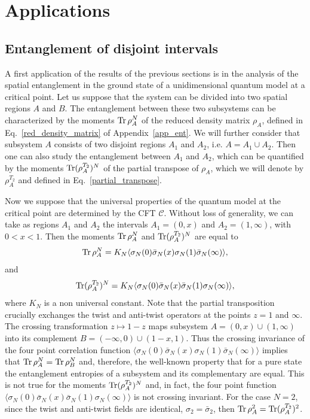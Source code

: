 \documentclass[a4paper,11pt]{article}
\def\Tr{\mathop{\mbox{\normalfont Tr}}\nolimits}
\begin{document}
\section{Applications}\label{sec:num_bootstrap}

\subsection{Entanglement of disjoint intervals}

A first application of the results of the previous sections is in 
the analysis of the spatial entanglement in the ground state of a 
unidimensional quantum model at a critical point. Let us suppose that 
the system can be divided into two spatial regions $A$ and $B$. The entanglement
between these two subsystems can be characterized by the moments $\Tr\rho_A^N$
of the reduced density matrix $\rho_A$, defined in Eq.~\eqref{red_density_matrix} 
of Appendix~\ref{app_ent}. We will further consider that subsystem $A$ consists 
of two disjoint regions $A_1$ and $A_2$, i.e. $A=A_1\cup A_2$. Then one can also 
study the entanglement between $A_1$ and $A_2$, which can be quantified by the moments 
$\Tr (\rho_A^{T_2})^N$ of the partial transpose of $\rho_A$, which we will denote by $\rho_A^{T_2}$
and defined in Eq.~\eqref{partial_transpose}.

Now we suppose that the universal properties of the quantum model at the critical 
point are determined by the CFT $\mathcal{C}$. Without loss of generality, we can 
take as regions $A_1$ and $A_2$ the intervals $A_1=(0, x)$ and $A_2=(1, \infty)$, 
with $0<x<1$. Then the moments $\Tr \rho_A^N $ and $\Tr (\rho_A^{T_2})^N$ are equal to 
~\cite{Calabrese09, Calabrese11}
 \begin{equation}\label{red_mat_ft}
 \Tr\rho_A^N=K_N\langle \sigma_N(0)\bar{\sigma}_N(x)\sigma_N(1)\bar{\sigma}_N(\infty)\rangle,
 \end{equation}
 and~\cite{CalabreseNeg12, CalabreseNeg}
 \begin{equation}\label{partial_trans_ft}
 \Tr(\rho_A^{T_2})^N=K_N\langle \sigma_N(0)\bar{\sigma}_N(x)\bar{\sigma}_N(1)\sigma_N(\infty)\rangle,
 \end{equation}
where $K_N$ is a non universal constant. Note that the partial transposition crucially exchanges the twist and anti-twist operators 
at the points $z=1$ and $\infty$. The crossing transformation $z\mapsto 1-z$ maps subsystem 
$A=(0, x)\cup(1, \infty)$ into its complement $B=(-\infty, 0)\cup(1-x, 1)$. Thus
the crossing invariance of the four point correlation function $\langle \sigma_N(0)
\bar{\sigma}_N(x) \sigma_N(1) \bar{\sigma}_N(\infty)\rangle$ implies that $\Tr\rho_A^N=\Tr\rho_B^N$
and, therefore, the well-known property that for a pure state the entanglement entropies of a 
subsystem and its complementary are equal. This is not true for the moments $\Tr(\rho_A^{T_2})^N$
and, in fact, the four point function $ \langle \sigma_N(0)\bar{\sigma}_N(x)\bar{\sigma}_N(1)\sigma_N(\infty)\rangle$
is not crossing invariant. For the case $N=2$, since the twist and anti-twist fields are identical, $\sigma_2=\bar{\sigma}_2$, 
then $\Tr\rho_A^2=\Tr(\rho_A^{T_2})^2$. 
\end{document}
